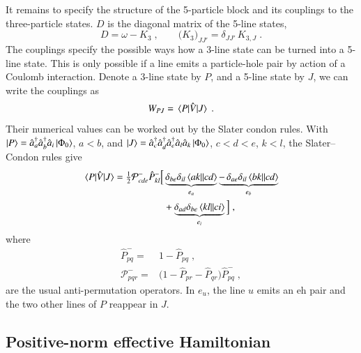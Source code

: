 \documentclass[aip,jcp,reprint,noshowkeys,superscriptaddress]{revtex4-1}
\newcommand{\cre}[1]{\Hat{a}_{#1}^{\dag}}
\newcommand{\ani}[1]{\Hat{a}_{#1}}
\newcommand{\eh}{\text{eh}}
\begin{document}
It remains to specify the structure of the 5-particle block and its couplings
to the three-particle states.
$D$ is the diagonal matrix of the 5-line states,
\begin{equation}
	D = \omega-K_3 \;,
	\qquad
	\big(K_3\big)_{JJ'}=\delta_{JJ'}\,K_{3,J} \;.
\end{equation}
The couplings specify the possible ways how a 3-line state can be turned into a
5-line state. This is only possible if a line emits a particle-hole pair by action
of a Coulomb interaction. Denote a 3-line state by $P$, and a 5-line state by $J$,
we can write the couplings as
\begin{equation}
	W_{PJ} = \mel{P}{\hat V}{J} \;.
\end{equation}
Their numerical values can be worked out by the Slater condon rules.
With $\ket{P}=\cre{a}\cre{b}\ani{i}\ket{\Phi_0}$, $a<b$, and
$\ket{J}=\cre{c}\cre{d}\cre{e}\ani{l}\ani{k}\ket{\Phi_0}$, $c<d<e$, $k<l$,
the Slater--Condon rules give
\begin{equation}
\begin{aligned}
\mel{P}{\hat V}{J}
={}&
\tfrac12\mathcal P^-_{cde}\hat P^-_{kl}
\Big[
\underbrace{\delta_{be}\delta_{il}\mel{ak}{}{cd}}_{e_a}
\underbrace{-\,\delta_{ae}\delta_{il}\mel{bk}{}{cd}}_{e_b}
\\
&\hphantom{\tfrac12\mathcal P^-_{cde}\hat P^-_{kl}\Big[}
+\underbrace{\delta_{ad}\delta_{be}\mel{kl}{}{ci}}_{e_i}
\Big] \;,
\end{aligned}
\label{eq:E3}
\end{equation}
where
\begin{equation}
\begin{aligned}
\hat P^-_{pq} = & 1-\hat P_{pq} \;, \\
\mathcal P^-_{pqr}
= &
\big(1-\hat P_{pr}-\hat P_{qr}\big)\hat P^-_{pq} \;,
\end{aligned}
\label{eq:antisymmetrizers}
\end{equation}
are the usual anti-permutation operators.
In $e_u$, the line $u$ emits an $\eh$ pair and the two other lines of $P$
reappear in $J$.

\subsection{Positive-norm effective Hamiltonian}
\end{document}
